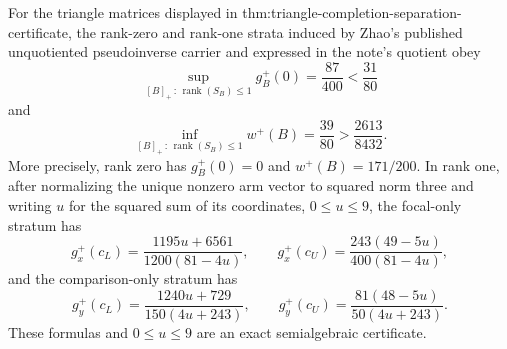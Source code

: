 For the triangle matrices displayed in thm:triangle-completion-separation-certificate, the rank-zero and rank-one strata induced by Zhao's published unquotiented pseudoinverse carrier and expressed in the note's quotient obey
\[
\sup_{[B]_+\,:\,\operatorname{rank}(S_B)\le1}g_B^+(0)
=\frac{87}{400}<\frac{31}{80}
\]
and
\[
\inf_{[B]_+\,:\,\operatorname{rank}(S_B)\le1}w^+(B)
=\frac{39}{80}>\frac{2613}{8432}.
\]
More precisely, rank zero has \(g_B^+(0)=0\) and \(w^+(B)=171/200\).  In rank one, after normalizing the unique nonzero arm vector to squared norm three and writing \(u\) for the squared sum of its coordinates, \(0\le u\le9\), the focal-only stratum has
\[
g_x^+(c_L)=\frac{1195u+6561}{1200(81-4u)},
\qquad g_x^+(c_U)=\frac{243(49-5u)}{400(81-4u)},
\]
and the comparison-only stratum has
\[
g_y^+(c_L)=\frac{1240u+729}{150(4u+243)},
\qquad g_y^+(c_U)=\frac{81(48-5u)}{50(4u+243)}.
\]
These formulas and \(0\le u\le9\) are an exact semialgebraic certificate.
